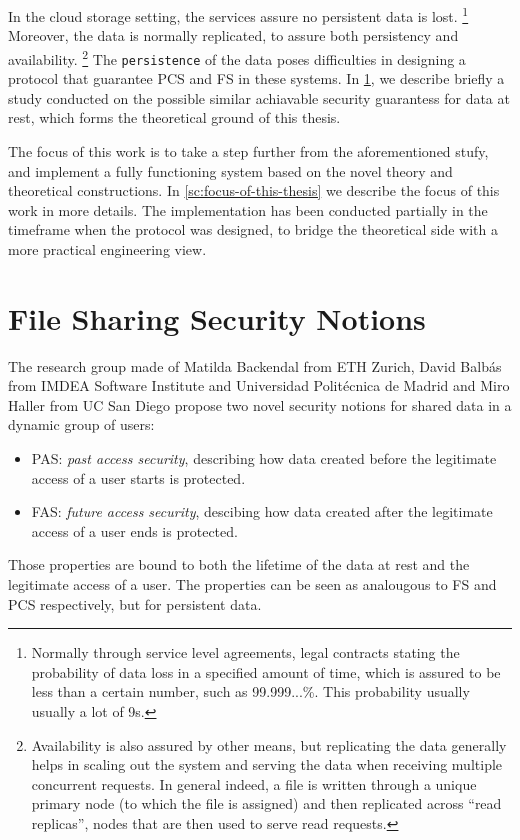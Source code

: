 In the cloud storage setting, the services assure no persistent data is lost.
\footnote{Normally through service level agreements, legal contracts stating the probability of data loss in a specified amount of time, which is assured to be less than a certain number, such as 99.999...\%. This probability usually usually a lot of 9s.} 
Moreover, the data is normally replicated, to assure both persistency and availability.
\footnote{Availability is also assured by other means, but replicating the data generally helps in scaling out the system and serving the data when receiving multiple concurrent requests. In general indeed, a file is written through a unique primary node (to which the file is assigned) and then replicated across ``read replicas'', nodes that are then used to serve read requests.}
The \texttt{persistence} of the data poses difficulties in designing a protocol that guarantee PCS and FS in these systems.
In \cref{sc:file-sharing-security-notions}, we describe briefly a study conducted on the possible similar achiavable security guarantess for data at rest, which forms the theoretical ground of this thesis.

The focus of this work is to take a step further from the aforementioned stufy, 
and implement a fully functioning system based on the novel theory and theoretical constructions.
In \cref{sc:focus-of-this-thesis} we describe the focus of this work in more details.
The implementation has been conducted partially in the timeframe when the protocol was designed, to bridge the theoretical side with a more practical engineering view.


\section{File Sharing Security Notions}\label{sc:file-sharing-security-notions}

The research group made of Matilda Backendal from ETH Zurich,
David Balb{\'a}s from IMDEA Software Institute and Universidad Polit{\'e}cnica de Madrid 
and Miro Haller from UC San Diego propose two novel security notions for shared data in
a dynamic group of users: 
\begin{itemize}
    \item PAS: \textit{past access security}, describing how data created before the legitimate access of a user starts is protected.
    \item FAS: \textit{future access security}, descibing how data created after the legitimate access of a user ends is protected.
\end{itemize}
Those properties are bound to both the lifetime of the data at rest and the legitimate access of a user.
The properties can be seen as analougous to FS and PCS respectively, but for persistent data.

